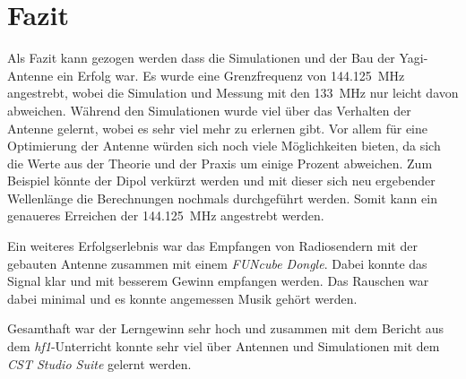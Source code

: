 \section{Fazit}\label{sec:Fazit}

Als Fazit kann gezogen werden dass die Simulationen und der Bau der Yagi-Antenne ein Erfolg war. Es wurde eine Grenzfrequenz von \SI{144.125}{MHz} angestrebt, wobei die Simulation und Messung mit den \SI{133}{MHz} nur leicht davon abweichen. Während den Simulationen wurde viel über das Verhalten der Antenne gelernt, wobei es sehr viel mehr zu erlernen gibt. Vor allem für eine Optimierung der Antenne würden sich noch viele Möglichkeiten bieten, da sich die Werte aus der Theorie und der Praxis um einige Prozent abweichen. Zum Beispiel könnte der Dipol verkürzt werden und mit dieser sich neu ergebender Wellenlänge die Berechnungen nochmals durchgeführt werden. Somit kann ein genaueres Erreichen der \SI{144.125}{MHz} angestrebt werden. 

Ein weiteres Erfolgserlebnis war das Empfangen von Radiosendern mit der gebauten Antenne zusammen mit einem \textit{FUNcube Dongle}. Dabei konnte das Signal klar und mit besserem Gewinn empfangen werden. Das Rauschen war dabei minimal und es konnte angemessen Musik gehört werden.

Gesamthaft war der Lerngewinn sehr hoch und zusammen mit dem Bericht aus dem \textit{hf1}-Unterricht konnte sehr viel über Antennen und Simulationen mit dem \textit{CST Studio Suite} gelernt werden.
